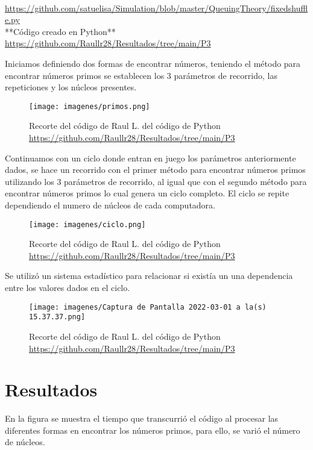 \documentclass{article}
\begin{document}
\\\url{https://github.com/satuelisa/Simulation/blob/master/QueuingTheory/fixedshuffle.py}\\


**Código creado en Python**\\

\url{https://github.com/Raullr28/Resultados/tree/main/P3}

Iniciamos definiendo dos formas de encontrar números, teniendo el método para encontrar números primos se establecen los 3 parámetros de recorrido, las repeticiones y los núcleos presentes.
\begin{figure}[h]
     \centering
     \texttt{[image: imagenes/primos.png]}
        \caption{Recorte del código de Raul L. del código de Python 
    \url{https://github.com/Raullr28/Resultados/tree/main/P3}}
     \label{}
 \end{figure}
 \newpage
 Continuamos con un ciclo donde entran en juego los parámetros anteriormente dados, se hace un recorrido con el primer método para encontrar números primos utilizando los 3 parámetros de recorrido, al igual que con el segundo método para encontrar números primos lo cual genera un ciclo completo.
 El ciclo se repite dependiendo el numero de núcleos de cada computadora.
 \begin{figure}[h]
     \centering
     \texttt{[image: imagenes/ciclo.png]}
        \caption{Recorte del código de Raul L. del código de Python 
    \url{https://github.com/Raullr28/Resultados/tree/main/P3}}
     \label{}
 \end{figure}
\newpage
Se utilizó un sistema estadístico para relacionar si existía un una dependencia entre los valores dados en el ciclo. 
\begin{figure}[h]
     \centering
     \texttt{[image: imagenes/Captura de Pantalla 2022-03-01 a la(s) 15.37.37.png]}
        \caption{Recorte del código de Raul L. del código de Python 
    \url{https://github.com/Raullr28/Resultados/tree/main/P3}}
     \label{}
 \end{figure}
 
 
\section{Resultados}
En la figura se muestra el tiempo que transcurrió el código al procesar las diferentes formas en encontrar los números primos, para ello, se varió el número de núcleos.
\end{document}

